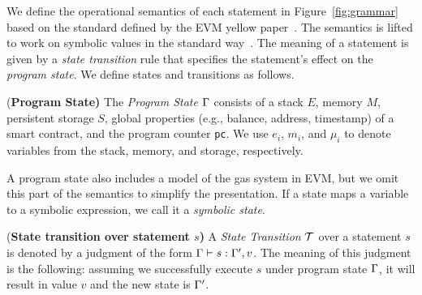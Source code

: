 We define the operational semantics of each statement in Figure~\ref{fig:grammar} 
based on the standard defined by the EVM yellow paper~\cite{evm-yellow}. 
The semantics is lifted to work on symbolic values in the standard way~\cite{rosette}.
The meaning of a statement 
is given by a \emph{state transition} rule that specifies the statement's 
effect on the \emph{program state}. We define states and transitions as follows. 
%
\begin{definition}{{(\bf Program State)}}
The \emph{Program State} $\Gamma$ consists of a stack $E$, memory $M$,
 persistent storage $S$, global properties (e.g., balance, address, timestamp)
 of a smart contract, and the program counter \texttt{pc}. We use $e_i$, $m_i$,
 and $\mu_i$ to denote variables from the stack, memory, and storage,
 respectively. 
\end{definition}
%
\noindent A program state also includes a model of the gas system in EVM, but we
omit this part of the semantics to simplify the presentation. If a state maps a
variable to a symbolic expression, we call it a \emph{symbolic state}.  
%
\begin{definition}{{(\bf State transition over statement $s$)}}
  A \emph{State Transition} $\mathcal{T}$ over a statement $s$ is
  denoted by a judgment of the form $\Gamma \vdash s: \Gamma', v$. 
  The meaning of this judgment is the following: assuming we successfully execute $s$ under program 
  state $\Gamma$, it will result in value $v$ and the new state is $\Gamma'$. 
\end{definition}




